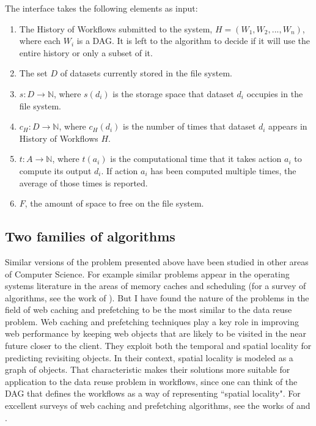 The interface takes the following elements as input:

\begin{enumerate}
\item The History of Workflows submitted to the system, $H = (W_1, W_2, ..., W_n)$, where each $W_i$ is a DAG. It is left to the algorithm to decide if it will use the entire history or only a subset of it.

\item The set $D$ of datasets currently stored in the file system. 

\item $s: D \to \mathbb{N} $, where $s(d_i)$ is the storage space that dataset $d_i$ occupies in the file system.\\

\item $c_H: D \to \mathbb{N}$, where $c_H(d_i)$ is the number of times that dataset $d_i$ appears in History of Workflows $H$.

\item $t: A \to \mathbb{N}$, where $t(a_i)$ is the computational time that it takes action $a_i$ to compute its output $d_i$.  If action $a_i$ has been computed multiple times, the average of those times is reported.

\item $F$, the amount of space to free on the file system.

\end{enumerate}

\subsection{Two families of algorithms}
Similar versions of the problem presented above have been studied in other areas of Computer Science.  For example similar problems appear in the operating systems literature in the areas of memory caches \citep{smith1982cache} and scheduling (for a survey of algorithms, see the work of \cite{ramamritham1994scheduling}). But I have found the nature of the problems in the field of web caching and prefetching to be the most similar to the data reuse problem.  Web caching and prefetching techniques play a key role in improving web performance by keeping web objects that are likely to be visited in the near future closer to the client. They exploit both the temporal and spatial locality for predicting revisiting objects. In their context, spatial locality is modeled as a graph of objects. That characteristic makes their solutions more suitable for application to the data reuse problem in workflows, since one can think of the DAG that defines the workflows as a way of representing ``spatial locality".  For excellent surveys of web caching and prefetching algorithms, see the works of \cite{wang1999survey} and \cite{ali2011survey}.

